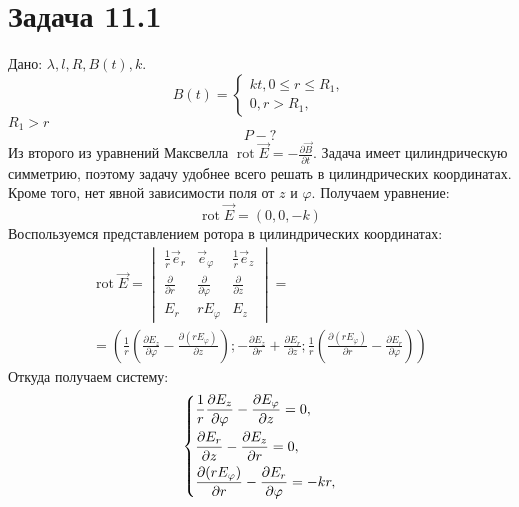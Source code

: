 \documentclass[11pt]{article}
\begin{document}
\section{Задача 11.1}
\label{sec:orgbaee15c}
Дано: \(\lambda, l, R, B(t), k\).
\begin{equation*}
B(t) = \begin{cases}
kt, 0 \leq r \leq R_1,\\
0, r > R_1,
\end{cases}
\end{equation*}
\(R_1 > r\)
$$P - ?$$
Из второго из уравнений Максвелла \(\operatorname{rot}\vec E = -\frac{\partial\vec B}{\partial t}\). Задача имеет
цилиндрическую симметрию, поэтому задачу удобнее всего решать в цилиндрических координатах. Кроме того, нет явной
зависимости поля от \(z\) и \(\varphi\). Получаем уравнение:
\begin{equation}
\operatorname{rot}\vec E = (0, 0, -k)
\end{equation}
Воспользуемся представлением ротора в цилиндрических координатах:
\begin{multline*}
\operatorname{rot}\vec E = 
\begin{vmatrix}
\frac{1}r \vec e_r          & \vec e_\varphi                    & \frac{1}r \vec e_z       \\
\frac{\partial}{\partial r} & \frac{\partial}{\partial \varphi} & \frac{\partial}{\partial z} \\
E_r                         & r E_\varphi                       & E_z
\end{vmatrix}
= \\
= \left(\frac{1}{r}\left(\frac{\partial E_z}{\partial\varphi} - \frac{\partial (rE_\varphi)}{\partial z}\right);
-\frac{\partial E_z}{\partial r} + \frac{\partial E_r}{\partial z};
\frac{1}r\left(\frac{\partial (rE_\varphi)}{\partial r} - \frac{\partial E_r}{\partial\varphi}\right)\right)
\end{multline*}
Откуда получаем систему:
\begin{equation*}
\begin{dcases}
\frac{1}r\frac{\partial E_z}{\partial \varphi} - \frac{\partial E_\varphi}{\partial z} = 0, \\
\frac{\partial E_r}{\partial z} - \frac{\partial E_z}{\partial r} = 0, \\
\frac{\partial (rE_\varphi)}{\partial r} - \frac{\partial E_r}{\partial\varphi} = -kr, \\
\end{dcases}
\end{equation*}
\end{document}
